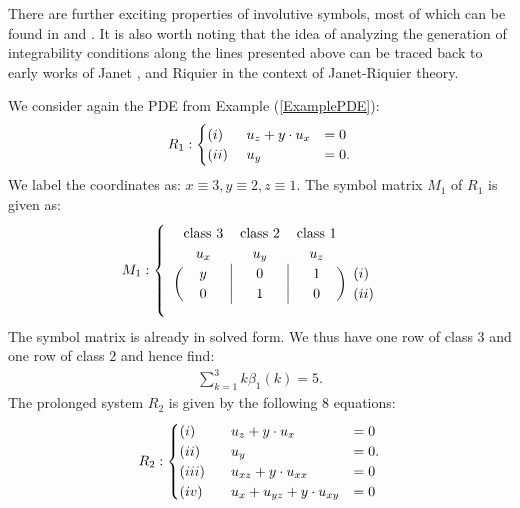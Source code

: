 There are further exciting properties of involutive symbols, most of which can be found in \cite{seiler2009involution} and \cite{seiler2009involution}. It is also worth noting that the idea of analyzing the generation of integrability conditions along the lines presented above can be traced back to early works of Janet \cite{janet1920systemes}, \cite{MSM_1927__21__1_0} and Riquier \cite{bateman_1910} in the context of Janet-Riquier theory.

\begin{example}
We consider again the PDE from Example (\ref{ExamplePDE}):
\begin{align}
    R_1 : \begin{cases} (i)\hphantom{i} \ \ \ \ u_z + y \cdot u_x &= 0\\
                        (ii) \ \ \ \ u_y &= 0.
            \end{cases}
\end{align}
We label the coordinates as: $x \equiv 3, y \equiv 2, z \equiv 1$. The symbol matrix $M_1$ of $R_1$ is given as:
\begin{align}
M_1 : \begin{cases}
\ \ 
\begin{blockarray}{cccc}
\text{class 3} & \text{class 2} & \text{class 1} \\
u_x & u_y & u_z \\
\begin{block}{(c|c|c)l}
  y & 0 & 1 & (i) \\
  0 & 1 & 0 & (ii) \\
\end{block}
\end{blockarray}
\end{cases}
\end{align}
The symbol matrix is already in solved form. We thus have one row of class $3$ and one row of class $2$ and hence find:
\begin{align}
  \sum_{k=1}^3 k\beta_1(k) = 5.  
\end{align}
The prolonged system $R_2$ is given by the following $8$ equations:
\begin{align}
    R_2 : \begin{cases} (i)\hphantom{vii} \ \ \ \   u_z + y \cdot u_x &= 0 \\
                        (ii)\hphantom{vi} \ \ \ \  u_y &= 0. \\
                        (iii)\hphantom{v} \ \ \ \  u_{xz} + y \cdot u_{xx} &= 0 \\
                        (iv)\hphantom{ii} \ \ \ \  u_x + u_{yz} + y \cdot u_{xy} &= 0 \\

\end{cases}
\end{align}
\end{example}
